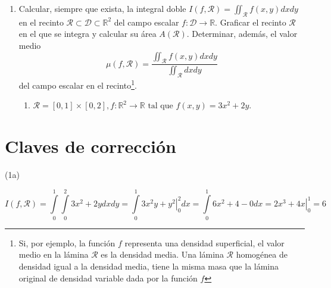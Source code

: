 \begin{enumerate}

\item Calcular, siempre que exista, la integral doble $I(f,\mathcal{R}) = \iint_{\mathcal{R}}f(x,y)dxdy$ en el recinto $\mathcal{R} \subset \mathcal{D} \subset \mathbb{R}^2$ del campo escalar $f: \mathcal{D} \rightarrow \mathbb{R}$. Graficar el recinto $\mathcal{R}$ en el que se integra y calcular su \'area $A(\mathcal{R})$. Determinar, adem\'as, el valor medio $$\mu(f,\mathcal{R}) = \frac{\iint_{\mathcal{R}}f(x,y)dxdy}{\iint_{\mathcal{R}}dxdy}$$ del campo escalar en el recinto\footnote{Si, por ejemplo, la funci\'on $f$ representa una densidad superficial, el valor medio en la l\'amina $\mathcal{R}$ es la densidad media. Una l\'amina $\mathcal{R}$ homog\'enea de densidad igual a la densidad media, tiene la misma masa que la l\'amina original de densidad variable dada por la funci\'on $f$}.
\begin{enumerate}
	\item $\mathcal{R} = \left[ 0, 1 \right] \times \left[ 0, 2 \right], f: \mathbb{R}^2 \rightarrow \mathbb{R} \textrm{ tal que } f(x,y) = 3x^2 + 2y$.
\end{enumerate}

\end{enumerate}

\section{Claves de correcci\'on}

\begin{exercise}

(1a)



$$
I(f,\mathcal{R}) = \int\limits_0^1 \int\limits_0^2 3x^2+2y dxdy =
\int\limits_0^1 \left. 3x^2 y + y^2 \right|_0^2 dx =
\int\limits_0^1 6x^2 + 4 - 0 dx =
\left. 2x^3+ 4x \right|_0^1 = 6
$$

\end{exercise}

